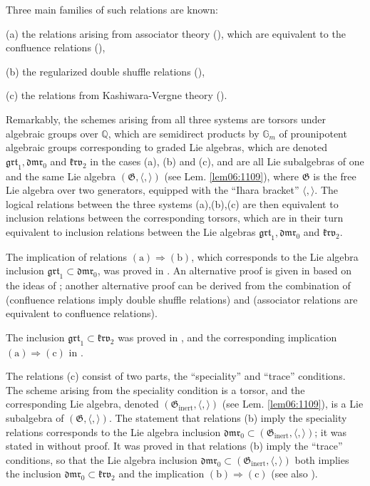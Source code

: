 \documentclass[10pt]{amsart}
\numberwithin{equation}{subsection}
\begin{document}
Three main families of such relations are known: 

(a) the relations arising from associator theory (\cite{Dr,LM}), which are equivalent to the confluence relations 
(\cite{HS,Fu:confl}), 

(b) the regularized double shuffle relations (\cite{IKZ,R,Ec1}),

(c) the relations from Kashiwara-Vergne theory (\cite{AT,AET}). 

Remarkably, the schemes arising from all three systems are torsors under algebraic groups over $\mathbb Q$, which 
are semidirect products by $\mathbb G_m$ of prounipotent algebraic groups corresponding to graded Lie algebras, 
which are denoted $\mathfrak{grt}_1,\mathfrak{dmr}_0$ and $\mathfrak{krv}_2$ in the cases (a), (b)  and (c), 
and are all Lie subalgebras of one and the same Lie algebra $(\mathfrak G,\langle,\rangle)$ 
(see Lem. \ref{lem06:1109}), where $\mathfrak G$ is the free Lie algebra over two generators, equipped with the 
``Ihara bracket'' $\langle,\rangle$. The logical relations between the three systems
(a),(b),(c) are then equivalent to inclusion relations between the corresponding torsors, which are
in their turn equivalent to inclusion relations between the Lie algebras 
$\mathfrak{grt}_1,\mathfrak{dmr}_0$ and $\mathfrak{krv}_2$. 

The implication of relations $(\mathrm{a})\Rightarrow(\mathrm{b})$, which corresponds to the Lie algebra inclusion 
$\mathfrak{grt}_1\subset\mathfrak{dmr}_0$, was proved in \cite{Fu:assandDS}. An alternative proof 
is given in \cite{EF1,EF2} based on the ideas of \cite{DT,T}; another alternative proof can be derived from the
combination of \cite{HS} (confluence relations imply double shuffle relations) and \cite{Fu:confl} 
(associator relations are equivalent to confluence relations). 

The inclusion $\mathfrak{grt}_1\subset\mathfrak{krv}_2$ was proved in \cite{AT}, and the corresponding 
implication  $(\mathrm{a})\Rightarrow(\mathrm{c})$ in \cite{AET}. 

The relations (c) consist of two parts, the ``speciality'' and ``trace'' conditions. The scheme arising from the 
speciality condition is a torsor, and the corresponding Lie algebra, denoted $(\mathfrak G_{\mathrm{inert}},\langle,\rangle)$
(see Lem. \ref{lem06:1109}), is a Lie subalgebra of $(\mathfrak G,\langle,\rangle)$. The statement that 
relations (b) imply the speciality relations corresponds to 
the Lie algebra inclusion $\mathfrak{dmr}_0\subset (\mathfrak G_{\mathrm{inert}},\langle,\rangle)$; it 
was stated in \cite{Ec2} without proof. It was proved in \cite{Sch1} that relations (b) imply the ``trace''
conditions, so that the Lie algebra inclusion $\mathfrak{dmr}_0\subset (\mathfrak G_{\mathrm{inert}},\langle,\rangle)$
both implies the inclusion $\mathfrak{dmr}_0\subset \mathfrak{krv}_2$ and the implication 
$(\mathrm{b})\Rightarrow(\mathrm{c})$ (see also \cite{FK}).  
\end{document}
